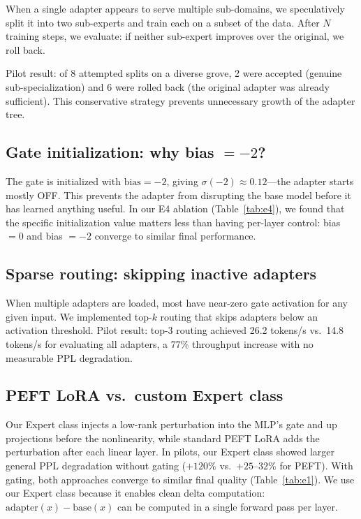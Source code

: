 \documentclass{article}
\begin{document}
When a single adapter appears to serve multiple sub-domains, we
speculatively split it into two sub-experts and train each on a
subset of the data. After $N$ training steps, we evaluate: if neither
sub-expert improves over the original, we roll back.

Pilot result: of 8 attempted splits on a diverse grove, 2 were
accepted (genuine sub-specialization) and 6 were rolled back (the
original adapter was already sufficient). This conservative strategy
prevents unnecessary growth of the adapter tree.

\subsection{Gate initialization: why bias $= -2$?}
\label{sec:pilot-gateinit}

The gate is initialized with $\text{bias} = -2$, giving
$\sigma(-2) \approx 0.12$---the adapter starts mostly OFF. This
prevents the adapter from disrupting the base model before it has
learned anything useful. In our E4 ablation
(Table~\ref{tab:e4}), we found that the specific initialization
value matters less than having per-layer control: bias $= 0$ and
bias $= -2$ converge to similar final performance.

\subsection{Sparse routing: skipping inactive adapters}
\label{sec:pilot-routing}

When multiple adapters are loaded, most have near-zero gate activation
for any given input. We implemented top-$k$ routing that skips
adapters below an activation threshold. Pilot result: top-3 routing
achieved 26.2 tokens/s vs.\ 14.8 tokens/s for evaluating all
adapters, a $77\%$ throughput increase with no measurable PPL
degradation.

\subsection{PEFT LoRA vs.\ custom Expert class}
\label{sec:pilot-peft}

Our Expert class injects a low-rank perturbation into the MLP's
gate and up projections before the nonlinearity, while standard
PEFT LoRA adds the perturbation after each linear layer. In pilots,
our Expert class showed larger general PPL degradation without
gating ($+120\%$ vs.\ $+25$--$32\%$ for PEFT). With gating, both
approaches converge to similar final quality
(Table~\ref{tab:e1}). We use our Expert class because it enables
clean delta computation: $\text{adapter}(x) - \text{base}(x)$
can be computed in a single forward pass per layer.
\end{document}
